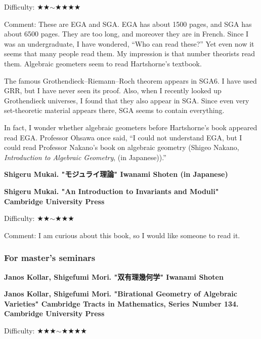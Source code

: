 Difficulty: ★★$\sim$★★★★  \vspace{-6pt} 

Comment: These are EGA and SGA. EGA has about 1500 pages, and SGA has about 6500 pages. They are too long, and moreover they are in French. Since I was an undergraduate, I have wondered, ``Who can read these?'' Yet even now it seems that many people read them. My impression is that number theorists read them. Algebraic geometers seem to read Hartshorne's textbook.

The famous Grothendieck--Riemann--Roch theorem appears in SGA6. I have used GRR, but I have never seen its proof. Also, when I recently looked up Grothendieck universes, I found that they also appear in SGA. Since even very set-theoretic material appears there, SGA seems to contain everything.

In fact, I wonder whether algebraic geometers before Hartshorne's book appeared read EGA. Professor Ohsawa once said, ``I could not understand EGA, but I could read Professor Nakano's book on algebraic geometry (Shigeo Nakano, \emph{Introduction to Algebraic Geometry}, (in Japanese)).''

\vspace{8pt}

\textbf{Shigeru Mukai. "モジュライ理論" Iwanami Shoten (in Japanese)}
\vspace{-6pt}

\textbf{Shigeru Mukai.  "An Introduction to Invariants and Moduli" Cambridge University Press}

Difficulty: ★★$\sim$★★★  \vspace{-6pt}

Comment: I am curious about this book, so I would like someone to read it.

\subsubsection{For master's seminars}

\textbf{Janos Kollar, Shigefumi Mori. "双有理幾何学" Iwanami Shoten} \vspace{-6pt}

\textbf{Janos Kollar, Shigefumi Mori. "Birational Geometry of Algebraic Varieties" Cambridge Tracts in Mathematics, Series Number 134. Cambridge University Press} \vspace{-6pt}

Difficulty: ★★★$\sim$★★★★\vspace{-6pt} 

